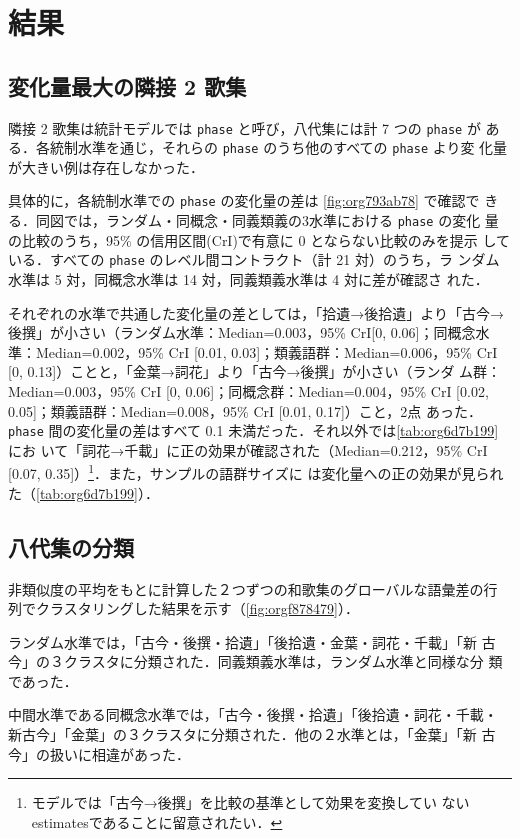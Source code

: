 \documentclass[submit]{ipsj}
\renewcommand{\ref}{\cref}
\begin{document}
\section{結果\label{orgbcb56c5}}
\label{sec:org56a72f9}
\subsection{変化量最大の隣接 2 歌集\label{org9a7d665}}
\label{sec:org915b7f3}
隣接 2 歌集は統計モデルでは \texttt{phase} と呼び，八代集には計 7 つの \texttt{phase} が
ある．各統制水準を通じ，それらの \texttt{phase} のうち他のすべての \texttt{phase} より変
化量が大きい例は存在しなかった．

具体的に，各統制水準での \texttt{phase} の変化量の差は \ref{fig:org793ab78} で確認で
きる．同図では，ランダム・同概念・同義類義の3水準における \texttt{phase} の変化
量の比較のうち，95\% の信用区間(CrI)で有意に 0 とならない比較のみを提示
している．すべての \texttt{phase} のレベル間コントラクト（計 21 対）のうち，ラ
ンダム水準は 5 対，同概念水準は 14 対，同義類義水準は 4 対に差が確認さ
れた．

それぞれの水準で共通した変化量の差としては，「拾遺→後拾遺」より「古今→
後撰」が小さい（ランダム水準：Median=0.003，95\% CrI[0, 0.06]；同概念水
準：Median=0.002，95\% CrI [0.01, 0.03]；類義語群：Median=0.006，95\%
CrI [0, 0.13]）ことと，「金葉→詞花」より「古今→後撰」が小さい（ランダ
ム群：Median=0.003，95\% CrI [0, 0.06]；同概念群：Median=0.004，95\% CrI
{[}0.02, 0.05]；類義語群：Median=0.008，95\% CrI [0.01, 0.17]）こと，2点
あった． \texttt{phase} 間の変化量の差はすべて 0.1 未満だった．それ以外では\ref{tab:org6d7b199} にお
いて「詞花→千載」に正の効果が確認された（Median=0.212，95\% CrI [0.07,
0.35]）\footnote{モデルでは「古今→後撰」を比較の基準として効果を変換してい
ないestimatesであることに留意されたい．}．また，サンプルの語群サイズに
は変化量への正の効果が見られた（\ref{tab:org6d7b199}）．
\subsection{八代集の分類\label{orgc509f0a}}
\label{sec:orgfd363b3}
非類似度の平均をもとに計算した２つずつの和歌集のグローバルな語彙差の行
列でクラスタリングした結果を示す（\ref{fig:orgf878479}）．

ランダム水準では，「古今・後撰・拾遺」「後拾遺・金葉・詞花・千載」「新
古今」の３クラスタに分類された．同義類義水準は，ランダム水準と同様な分
類であった．

中間水準である同概念水準では，「古今・後撰・拾遺」「後拾遺・詞花・千載・
新古今」「金葉」の３クラスタに分類された．他の２水準とは，「金葉」「新
古今」の扱いに相違があった．
\end{document}
